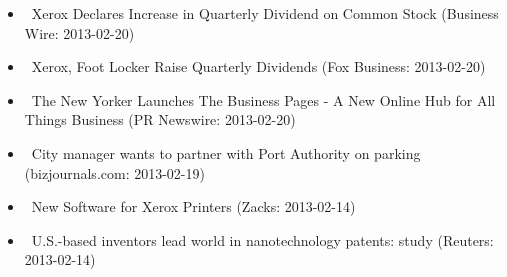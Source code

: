 \documentclass[11pt,asymmetric]{article}
\begin{document}
\begin{itemize}
\item\ Xerox Declares Increase in Quarterly Dividend on Common Stock (Business Wire: 2013-02-20)
\item\ Xerox, Foot Locker Raise Quarterly Dividends (Fox Business: 2013-02-20)
\item\ The New Yorker Launches The Business Pages - A New Online Hub for All Things Business (PR Newswire: 2013-02-20)
\item\ City manager wants to partner with Port Authority on parking (bizjournals.com: 2013-02-19)
\item\ New Software for Xerox Printers (Zacks: 2013-02-14)
\item\ U.S.-based inventors lead world in nanotechnology patents: study (Reuters: 2013-02-14)
\end{itemize}
\end{document}
